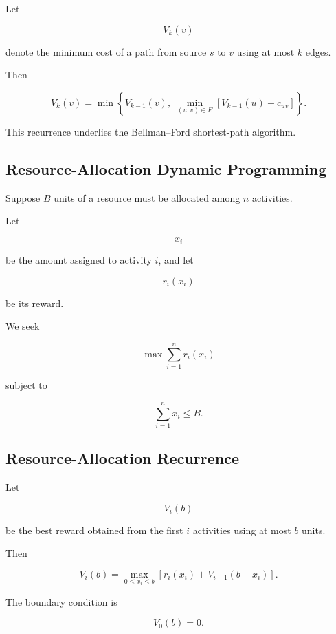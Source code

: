 Let

\[
V_k(v)
\]

denote the minimum cost of a path from source \(s\) to \(v\) using at most
\(k\) edges.

Then

\[
\boxed{
V_k(v)
=
\min
\left\{
V_{k-1}(v),
\;
\min_{(u,v)\in E}
[
V_{k-1}(u)+c_{uv}
]
\right\}.
}
\]

This recurrence underlies the Bellman--Ford shortest-path algorithm.

\subsection{Resource-Allocation Dynamic Programming}
\label{subsec:resource-allocation-dp}

Suppose \(B\) units of a resource must be allocated among \(n\) activities.

Let

\[
x_i
\]

be the amount assigned to activity \(i\), and let

\[
r_i(x_i)
\]

be its reward.

We seek

\[
\boxed{
\max
\sum_{i=1}^{n}
r_i(x_i)
}
\]

subject to

\[
\boxed{
\sum_{i=1}^{n}
x_i
\leq
B.
}
\]

\subsection{Resource-Allocation Recurrence}
\label{subsec:resource-allocation-recurrence}

Let

\[
V_i(b)
\]

be the best reward obtained from the first \(i\) activities using at most
\(b\) units.

Then

\[
\boxed{
V_i(b)
=
\max_{0\leq x_i\leq b}
\left[
r_i(x_i)
+
V_{i-1}(b-x_i)
\right].
}
\]

The boundary condition is

\[
\boxed{
V_0(b)=0.
}
\]

